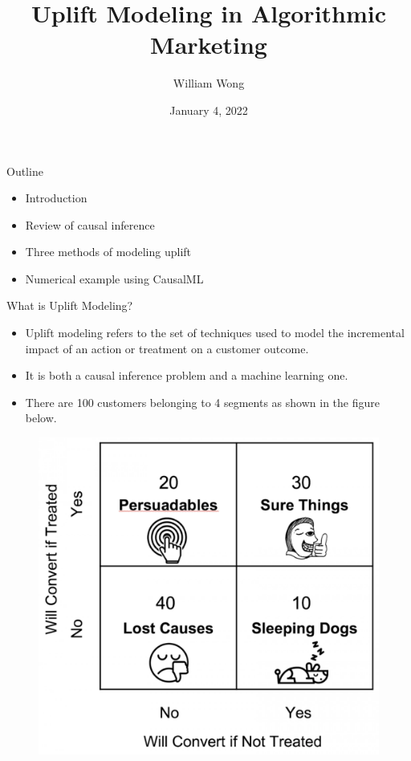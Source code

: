 \documentclass[20pt]{beamer}
\title{Uplift Modeling in Algorithmic Marketing}
\date{January 4, 2022}
\author{William Wong}
\begin{document}
\begin{frame}
  \titlepage
\end{frame}



\begin{frame}{Outline}
  \begin{itemize}
  \item Introduction

  \item Review of causal inference
  \item Three methods of modeling uplift

  \item Numerical example using CausalML
  \end{itemize}
\end{frame}


\begin{frame}{What is Uplift Modeling?}
\begin{itemize}
  \item Uplift modeling refers to the set of techniques used to model the incremental impact of an
  action or treatment on a customer outcome.

  \item It is both a causal inference problem and a machine learning one.

  \item There are 100 customers belonging to 4 segments as shown in the figure below.
\end{itemize}

  \begin{figure}[p]
    \centering
    \includegraphics[width=6in]{./images/customer_segments.png}
  \end{figure}

\end{frame}
\end{document}

